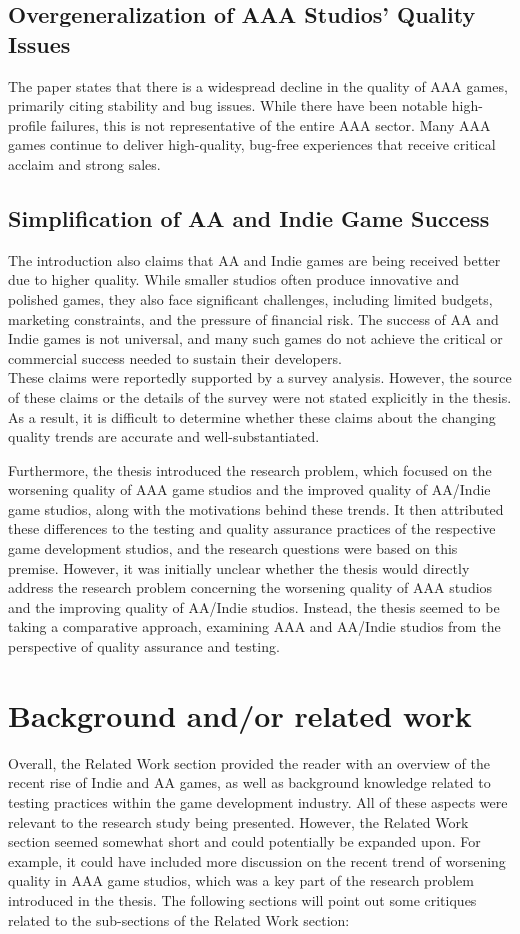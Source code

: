 \documentclass[conference]{IEEEtran}
\begin{document}
\subsection{Overgeneralization of AAA Studios' Quality Issues}
The paper states that there is a widespread decline in the quality of AAA games, primarily citing stability and bug issues. While there have been notable high-profile failures, this is not representative of the entire AAA sector. Many AAA games continue to deliver high-quality, bug-free experiences that receive critical acclaim and strong sales. 

\subsection{Simplification of AA and Indie Game Success}
The introduction also claims that AA and Indie games are being received better due to higher quality. While smaller studios often produce innovative and polished games, they also face significant challenges, including limited budgets, marketing constraints, and the pressure of financial risk. The success of AA and Indie games is not universal, and many such games do not achieve the critical or commercial success needed to sustain their developers.\\

These claims were reportedly supported by a survey analysis. However, the source of these claims or the details of the survey were not stated explicitly in the thesis. As a result, it is difficult to determine whether these claims about the changing quality trends are accurate and well-substantiated.

Furthermore, the thesis introduced the research problem, which focused on the worsening quality of AAA game studios and the improved quality of AA/Indie game studios, along with the motivations behind these trends. It then attributed these differences to the testing and quality assurance practices of the respective game development studios, and the research questions were based on this premise. However, it was initially unclear whether the thesis would directly address the research problem concerning the worsening quality of AAA studios and the improving quality of AA/Indie studios. Instead, the thesis seemed to be taking a comparative approach, examining AAA and AA/Indie studios from the perspective of quality assurance and testing.
\section{Background and\slash or related work}
Overall, the Related Work section provided the reader with an overview of the recent rise of Indie and AA games, as well as background knowledge related to testing practices within the game development industry. All of these aspects were relevant to the research study being presented. However, the Related Work section seemed somewhat short and could potentially be expanded upon. For example, it could have included more discussion on the recent trend of worsening quality in AAA game studios, which was a key part of the research problem introduced in the thesis. The following sections will point out some critiques related to the sub-sections of the Related Work section:\\
\end{document}
